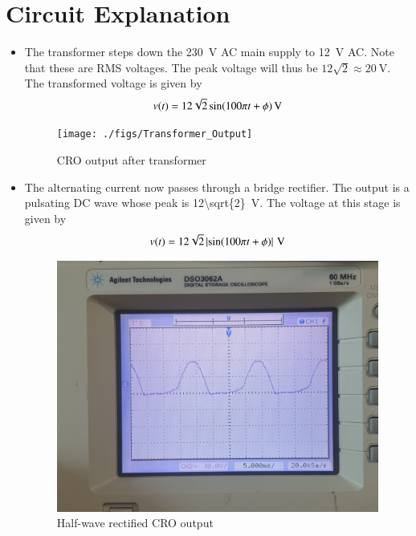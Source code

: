\documentclass[journal,12pt,twocolumn]{IEEEtran}
\providecommand{\abs}[1]{\left\vert#1\right\vert}
\numberwithin{equation}{section}
\numberwithin{figure}{section}
\begin{document}
	\section{Circuit Explanation}
	
	\begin{itemize}
		\item The transformer steps down the \SI{230}{\volt} AC main supply to \SI{12}{\volt} AC. Note that these are RMS voltages. The peak voltage will thus be $12\sqrt{2} \approx \SI{20}{\volt}$. The transformed voltage is given by
		\begin{align}
			v(t) = \SI[parse-numbers=false]{12\sqrt{2}\sin(100\pi t + \phi)}{\volt}
		\end{align}
	
		\begin{figure}[!ht]
			\centering
			\texttt{[image: ./figs/Transformer\_Output]}
			\caption{CRO output after transformer}
			\label{fig-transformer}	
		\end{figure}

		\item The alternating current now passes through a bridge rectifier. The output is a pulsating DC wave whose peak is \SI[parse-numbers=false]{12\sqrt{2}}{\volt}. The voltage at this stage is given by
		\begin{align}
			v(t) = \SI[parse-numbers=false]{12\sqrt{2}\abs{\sin(100\pi t + \phi)}}{\volt}
		\end{align}
		\begin{figure}[!ht]
			\centering
			\includegraphics[width=\columnwidth]{./figs/Half_wave_rectified.jpg}
		        \caption{Half-wave rectified CRO output}
			\label{fig-rectifier-1}	
		\end{figure}
		

\end{itemize}
\end{document}
